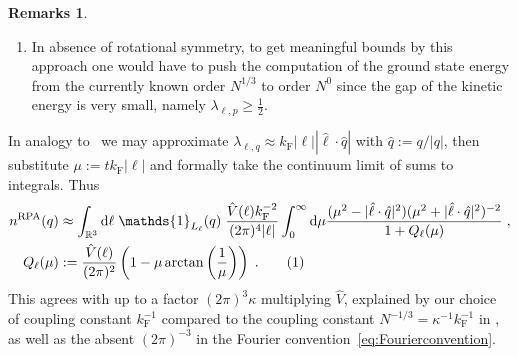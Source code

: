 \documentclass[12pt,a4paper]{article}
\numberwithin{equation}{section}
\newcommand{\1}{\mathbb{I}}
\newcommand{\di}{\textnormal{d}}
\newcommand{\F}{\mathrm{F}}
\newcommand{\RPA}{\mathrm{RPA}}
\newcommand{\kF}{k_\F}
\newcommand{\BFc}{B_\F^c}
\newcommand{\tagg}[1]{ \stepcounter{equation} \tag{\theequation}
\label{#1} } %
\newcommand{\R}{\mathbb{R}}
\theoremstyle{plain}
\theoremstyle{definition}
\newtheorem*{remarks}{Remarks}
\theoremstyle{remark}
\theoremstyle{plain}
\theoremstyle{definition}
\theoremstyle{remark}
\begin{document}
\begin{remarks}
\begin{enumerate}
The contribution of particle excitations to the expectation value of $\mathbb{H}_0$ may be written as $\sum_{p \in \BFc} \lvert \lvert p\rvert^2 - \kF^2 \rvert n(p)$; holes have a similar non-negative contribution. \emph{Assuming} that rotational symmetry was not broken (which is non-trivial to prove), we reorganize the sum over shells in momentum space of thickness less than one to get
\[
C \kF^{1-\frac{1}{48}} \geq \langle \psi, \mathbb{H}_0 \psi \rangle = \sum_{|p|} \lvert \lvert p\rvert^2 - \kF^2 \rvert |p|^{1 + \varepsilon} n(|p|) \;,
\]
where we rely on the number-theoretic result that the number of lattice points in shells of thickness less than one is of order $\text{(radius)}^{1+\varepsilon}$. This can be resolved for
the number of excitations at distance $f$ from the Fermi surface at $\kF$ is at most of order
\[
	n(\lvert p\rvert) \leq \frac{\kF}{\lvert \lvert p\rvert - \kF \rvert \lvert \lvert p\rvert + \kF \rvert \lvert p\rvert^{1+\varepsilon}}
\]
\textcolor{red}{complete this comment}

\item In absence of rotational symmetry, to get meaningful bounds by this approach one would have to push the computation of the ground state energy from the currently known order $N^{1/3}$ to order $N^0$ since the gap of the kinetic energy is very small, namely $\lambda_{\ell,p} \geq \frac{1}{2}$.

\end{enumerate}
\end{remarks}


In analogy to~\cite[Section~1.1]{BL25} we may approximate $ \lambda_{\ell,q} \approx \kF |\ell| |\hat{\ell} \cdot \hat{q}| $ with $ \hat{q} := {q}/{|q|} $, then substitute $ \mu := t \kF |\ell| $ and formally take the continuum limit of sums to integrals.
Thus
\begin{align*}
	n^{\RPA}(q)
	&\approx \int_{\R^3} \di \ell \; \mathds{1}_{L_{\ell}}(q) \; \frac{\hat{V}(\ell) \kF^{-2}}{(2 \pi)^4 |\ell|}
		\int_0^\infty \di \mu \frac{(\mu^2-|\hat{\ell} \cdot \hat{q}|^2) (\mu^2 + |\hat{\ell} \cdot \hat{q}|^2)^{-2}}{1 + Q_\ell(\mu)} \;, \\
	Q_\ell(\mu) &:= \frac{\hat{V}(\ell)}{(2 \pi)^2} \left( 1 - \mu \arctan \left( \frac{1}{\mu} \right) \right) \;. \tagg{eq:Q}
\end{align*}
This agrees with \cite{BL25} up to a factor $ (2 \pi)^3 \kappa $ multiplying $\hat{V}$, explained by our choice of coupling constant $k_\F^{-1}$ compared to the coupling constant $N^{-1/3} = \kappa^{-1} \kF^{-1}$ in \cite{BL25}, as well as the absent $ (2 \pi)^{-3} $ in the Fourier convention~\eqref{eq:Fourierconvention}.
\end{document}
